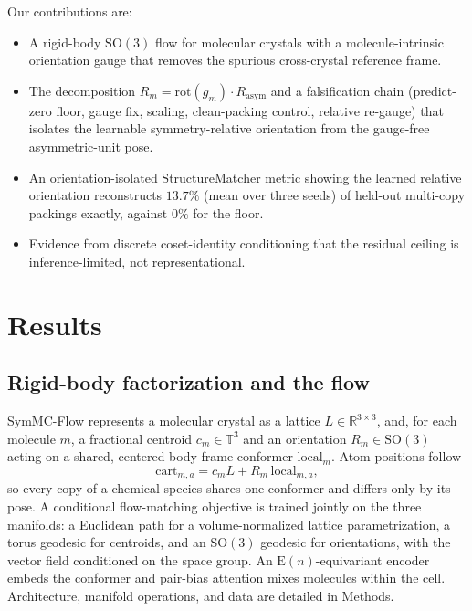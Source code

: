 \documentclass[10pt]{article}
\begin{document}
Our contributions are:
\begin{itemize}
\item A rigid-body $\mathrm{SO}(3)$ flow for molecular crystals with a
molecule-intrinsic orientation gauge that removes the spurious cross-crystal
reference frame.
\item The decomposition $R_m = \mathrm{rot}(g_m)\cdot R_{\text{asym}}$ and a
falsification chain (predict-zero floor, gauge fix, scaling, clean-packing
control, relative re-gauge) that isolates the learnable symmetry-relative
orientation from the gauge-free asymmetric-unit pose.
\item An orientation-isolated StructureMatcher metric showing the learned
relative orientation reconstructs $13.7\%$ (mean over three seeds) of held-out
multi-copy packings exactly, against $0\%$ for the floor.
\item Evidence from discrete coset-identity conditioning that the residual
ceiling is inference-limited, not representational.
\end{itemize}

\section{Results}

\subsection{Rigid-body factorization and the flow}

SymMC-Flow represents a molecular crystal as a lattice $L\in\mathbb{R}^{3\times3}$,
and, for each molecule $m$, a fractional centroid $c_m\in\mathbb{T}^3$ and an
orientation $R_m\in\mathrm{SO}(3)$ acting on a shared, centered body-frame
conformer $\text{local}_m$. Atom positions follow
\begin{equation}
\text{cart}_{m,a} = c_m L + R_m\,\text{local}_{m,a},
\label{eq:factor}
\end{equation}
so every copy of a chemical species shares one conformer and differs only by its
pose. A conditional flow-matching objective \citep{lipman2023flowmatching} is
trained jointly on the three manifolds: a Euclidean path for a
volume-normalized lattice parametrization, a torus geodesic for centroids, and
an $\mathrm{SO}(3)$ geodesic for orientations, with the vector field conditioned
on the space group. An $\mathrm{E}(n)$-equivariant
encoder \citep{satorras2021egnn} embeds the conformer and pair-bias attention
mixes molecules within the cell. Architecture, manifold operations, and data
are detailed in Methods.
\end{document}
